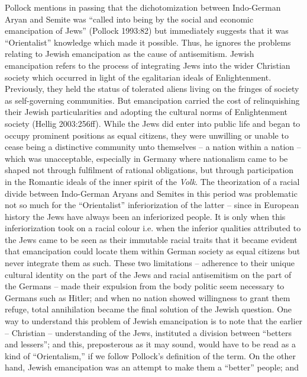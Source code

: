 Pollock mentions in passing that the dichotomization between Indo-German Aryan and Semite was “called into being by the social and economic emancipation of Jews” (Pollock 1993:82) but immediately suggests that it was “Orientalist” knowledge which made it possible. Thus, he ignores the problems relating to Jewish emancipation as the cause of antisemitism. Jewish emancipation refers to the process of integrating Jews into the wider Christian society which occurred in light of the egalitarian ideals of Enlightenment. Previously, they held the status of tolerated aliens living on the fringes of society as self-governing communities. But emancipation carried the cost of relinquishing their Jewish particularities and adopting the cultural norms of Enlightenment society (Hellig 2003:256ff). While the Jews did enter into public life and began to occupy prominent positions as equal citizens, they were unwilling or unable to cease being a distinctive community unto themselves – a nation within a nation – which was unacceptable, especially in Germany where nationalism came to be shaped not through fulfilment of rational obligations, but through participation in the Romantic ideals of the inner spirit of the {\sl Volk}. The theorization of a racial divide between Indo-German Aryans and Semites in this period was problematic not so much for the “Orientalist” inferiorization of the latter – since in European history the Jews have always been an inferiorized people. It is only when this inferiorization took on a racial colour i.e. when the inferior qualities attributed to the Jews came to be seen as their immutable racial traits that it became evident that emancipation could locate them within German society as equal citizens but never integrate them as such. These two limitations – adherence to their unique cultural identity on the part of the Jews and racial antisemitism on the part of the Germans – made their expulsion from the body politic seem necessary to Germans such as Hitler; and when no nation showed willingness to grant them refuge, total annihilation became the final solution of the Jewish question. One way to understand this problem of Jewish emancipation is to note that the earlier – Christian – understanding of the Jews, instituted a division between “betters and lessers”; and this, preposterous as it may sound, would have to be read as a kind of “Orientalism,” if we follow Pollock’s definition of the term. On the other hand, Jewish emancipation was an attempt to make them a “better” people; and 
